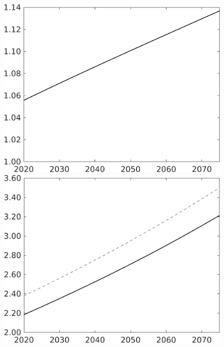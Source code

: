 \documentclass[12pt]{article}
\begin{document}
\begin{figure}[h!!]
\begin{minipage}[]{0.32\textwidth}
	\end{minipage}	
	\begin{minipage}[]{0.32\textwidth}
		\includegraphics[width=1\textwidth]{../../codding_model/own_basedOnFried/optimalPol_010922_revision/figures/all_13Sept22/CompTaul_LFBAU_Reg0_lambdaa_spillover0_nsk1_xgr0_knspil1_sep1_countec0_GovRev0_etaa0.79_lgd0.png}
	\end{minipage}	
	\begin{minipage}[]{0.32\textwidth}
		\includegraphics[width=1\textwidth]{../../codding_model/own_basedOnFried/optimalPol_010922_revision/figures/all_13Sept22/CompTaul_LFBAU_Reg0_Y_spillover0_nsk1_xgr0_knspil1_sep1_countec0_GovRev0_etaa0.79_lgd0.png}

\end{minipage}
\end{figure}
\end{document}

